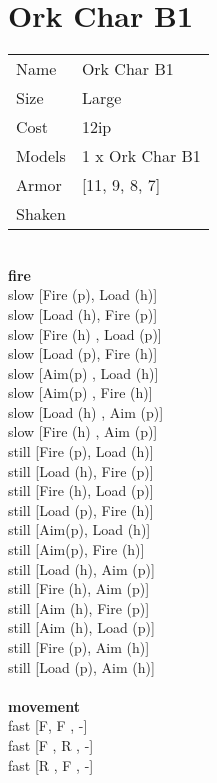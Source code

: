 \clearpage

\section{ Ork Char B1 }

\begin{tabular}{ll}
  Name & Ork Char B1 \\
  Size & Large\\
  Cost & 12ip\\
  Models & 1 x Ork Char B1\\
  Armor & [11, 9, 8, 7]\\
  Shaken & \\
\end{tabular}

\noindent 

\ \\ {\bf fire } \\
slow [Fire (p), Load (h)] \\
slow [Load (h), Fire (p)] \\
slow [Fire (h) ,  Load (p)] \\
slow [Load (p), Fire (h)] \\
slow [Aim(p) ,  Load (h)] \\
slow [Aim(p) ,  Fire (h)] \\
slow [Load (h) ,  Aim (p)] \\
slow [Fire (h) ,  Aim (p)] \\
still [Fire (p), Load (h)] \\
still [Load (h), Fire (p)] \\
still [Fire (h), Load (p)] \\
still [Load (p), Fire (h)] \\
still [Aim(p), Load (h)] \\
still [Aim(p), Fire (h)] \\
still [Load (h), Aim (p)] \\
still [Fire (h), Aim (p)] \\
still [Aim (h), Fire (p)] \\
still [Aim (h), Load (p)] \\
still [Fire (p), Aim (h)] \\
still [Load (p), Aim (h)] \\
\ \\ {\bf movement } \\
fast [F,  F ,  -] \\
fast [F ,  R ,  -] \\
fast [R ,  F ,  -] \\
